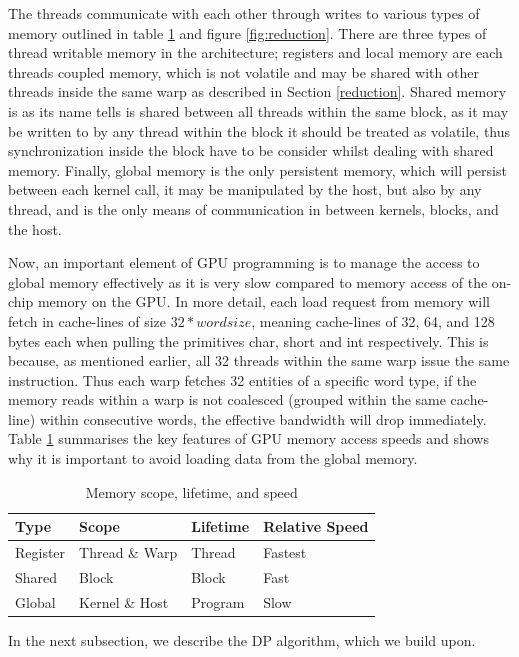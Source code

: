 \documentclass[a4paper, 12pt]{report}
\begin{document}
The threads communicate with each other through writes to various types of
memory outlined in table \ref{mem} and figure \ref{fig:reduction}. 
There are three types of thread writable memory in the architecture; registers
and local memory are each threads coupled memory, 
which is not volatile and may be shared with other threads inside the same warp
as described in Section \ref{reduction}. 
Shared memory is as its name tells is shared between all threads within the same
block, as it may be written to by any thread 
within the block it should be treated as volatile, thus synchronization inside
the block have to be consider whilst dealing with shared memory.
Finally, global memory is the only persistent memory, which will persist between
each kernel call, it may be manipulated by the host, 
but also by any thread, and is the only means of communication in between
kernels, blocks, and the host.

Now, an important element of GPU programming is to manage the access to global
memory effectively as it is very slow compared to memory access 
of the on-chip memory on the GPU. In more detail, each load request from memory
will fetch in cache-lines of size $32*wordsize$, meaning 
cache-lines of 32, 64, and 128 bytes each when pulling the primitives char,
short and int respectively. 
This is because, as mentioned earlier, all 32 threads within the same warp issue
the same instruction. 
Thus each warp fetches 32 entities of a specific word type, if the memory reads
within a warp is not coalesced (grouped within the same cache-line)
within consecutive words, the effective bandwidth will drop immediately. 
Table \ref{mem} summarises the key features of GPU memory access speeds and
shows why it is important to avoid loading data from the global memory.

\begin{table}
\centering
\caption{Memory scope, lifetime, and speed \label{mem}}
\begin{tabular}{|l|l|l|l|} \hline
Type&Scope&Lifetime&Relative Speed \\ \hline
Register&Thread \& Warp&Thread&Fastest\\
Shared&Block&Block&Fast\\
Global&Kernel \& Host&Program&Slow\\
\hline\end{tabular}
\end{table}
In the next subsection, we describe the DP algorithm, which we build upon.
\end{document}
